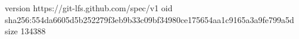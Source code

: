 version https://git-lfs.github.com/spec/v1
oid sha256:554da6605d5b252279f3eb9b33c09bf34980ce175654aa1c9165a3a9fe799a5d
size 134388
